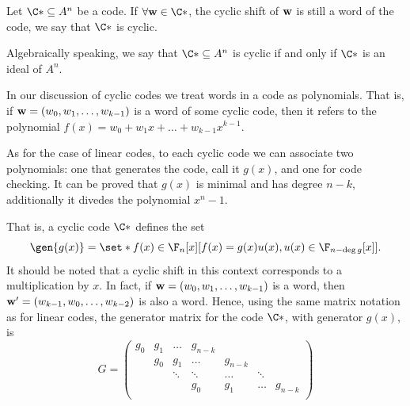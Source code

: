 \documentclass{subfiles}
\begin{document}
\label{Sec:6}
    \begin{definition*}
        Let \(\C* \subseteq A^{n}\) be a code. If \(\forall \bv{w} \in \C*\),
            the cyclic shift of \(\mathbf{w}\) is still a word of the code, 
            we say that \(\C*\) is cyclic.
    \end{definition*}

    \begin{remark*}
        Algebraically speaking, we say that \(\C* \subseteq A^{n}\) is cyclic
            if and only if \(\C*\) is an ideal of \(A^{n}\).
    \end{remark*}

    In our discussion of cyclic codes we treat words in a code as polynomials.
        That is, if \(\mathbf{w} = (w_{0}, w_{1}, \ldots, w_{k - 1})\) is a word of some cyclic code,
        then it refers to the polynomial \(f(x) = w_{0} + w_{1}x + \ldots + w_{k - 1}x^{k - 1}\).

    As for the case of linear codes, to each cyclic code we can associate two polynomials:
        one that generates the code, call it \(g(x)\), and one for code checking.
        It can be proved that \(g(x)\) is minimal and has degree \(n - k\),
        additionally it divedes the polynomial \(x^{n} - 1\).

    That is, a cyclic code \(\C*\) defines the set 
        \[
            \gen{g(x)} = \set*{f(x) \in \F_{n}[x]}[f(x) = g(x)u(x), u(x) \in \F_{n - \deg g}[x]].
        \]
    It should be noted that a cyclic shift in this context corresponds to a multiplication by \(x\).
        In fact, if \(\mathbf{w} = (w_{0}, w_{1}, \ldots, w_{k - 1})\) is a word, then 
        \(\mathbf{w}' = (w_{k - 1}, w_{0}, \ldots, w_{k - 2})\) is also a word.
        Hence, using the same matrix notation as for linear codes,
        the generator matrix for the code \(\C*\), with generator \(g(x)\), is
        \[
            G = \begin{pmatrix}
                g_{0}   & g_{1} & \ldots    & g_{n - k} &           &   & \\ 
                        & g_{0} & g_{1}     & \ldots    & g_{n - k} &   & \\
                        &       & \ddots     &\ddots     & \ldots   & \ddots & \\ 
                        &       &           & g_{0} & g_{1} & \ldots & g_{n - k} \\
            \end{pmatrix}
        \]
\end{document}
